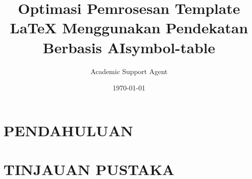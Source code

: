 \documentclass{beamer}
\title{Optimasi Pemrosesan Template LaTeX Menggunakan Pendekatan Berbasis AI}
\author{Academic Support Agent}
\date{\today}
\begin{document}
\maketitle

\begin{abstract}

\end{abstract}

\chapter{PENDAHULUAN}


\chapter{TINJAUAN PUSTAKA}


\usepackage[orientation=landscape,
size=custom,width=32,height=18.0,scale=.75]{beamerposter}
\title{symbol-table}
\end{document}

